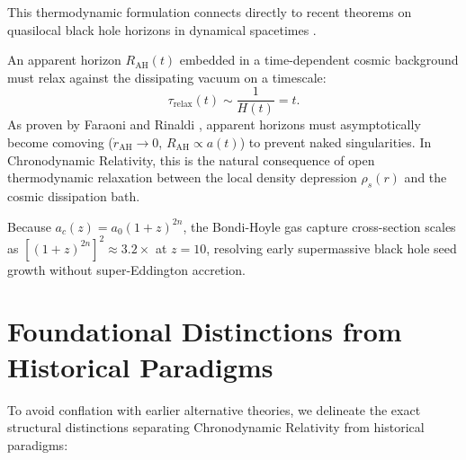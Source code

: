 \documentclass[aps,prd,reprint,superscriptaddress,nofootinbib,floatfix,amsmath,amssymb]{revtex4-2}
\begin{document}
This thermodynamic formulation connects directly to recent theorems on quasilocal black hole horizons in dynamical spacetimes \cite{FaraoniRinaldi2026}. 

An apparent horizon $R_{\text{AH}}(t)$ embedded in a time-dependent cosmic background must relax against the dissipating vacuum on a timescale:
\begin{equation}
\tau_{\text{relax}}(t) \sim \frac{1}{H(t)} = t.
\label{eq:horizon_relax}
\end{equation}
As proven by Faraoni and Rinaldi \cite{FaraoniRinaldi2026}, apparent horizons must asymptotically become comoving ($\dot{r}_{\text{AH}} \to 0$, $R_{\text{AH}} \propto a(t)$) to prevent naked singularities. In Chronodynamic Relativity, this is the natural consequence of open thermodynamic relaxation between the local density depression $\rho_s(r)$ and the cosmic dissipation bath.

Because $a_c(z) = a_0(1+z)^{2n}$, the Bondi-Hoyle gas capture cross-section scales as $[(1+z)^{2n}]^2 \approx 3.2\times$ at $z=10$, resolving early supermassive black hole seed growth without super-Eddington accretion.

\section{Foundational Distinctions from Historical Paradigms}
\label{sec:distinctions}

To avoid conflation with earlier alternative theories, we delineate the exact structural distinctions separating Chronodynamic Relativity from historical paradigms:
\end{document}
